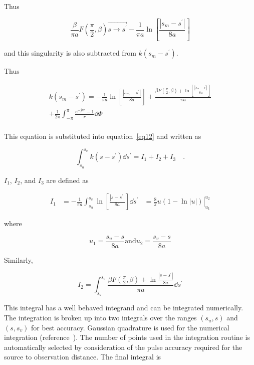 \documentclass[12pt]{article}
\begin{document}
Thus

\begin{equation}
\frac{\beta}{\pi a}F\left(\frac{\pi}{2},\beta\right)
\overrightarrow{s\rightarrow s^\prime}
-\frac{1}{\pi a}\ln\left[\frac{|s_m - s^\prime|}{8a}\right]
\label{eq18}
\end{equation}

and this singularity is also subtracted from $k(s_m-s^\prime)$.

Thus

\begin{equation}
\begin{gathered}
k(s_m - s^\prime) = -\frac{1}{\pi a}\ln \left[\frac{|s_m - s^\prime|}{8a}\right]
+\frac{\beta F(\frac{\pi}{2}, \beta)
      + \ln\left[\frac{|s_m - s^\prime|}{8a}\right]}{\pi a}  \\
+ \frac{1}{2\pi}\int_{-\pi}^\pi\frac{e^{-jkr}-1}{r}\dd{\Phi} \\
\end{gathered}
\label{eq19}
\end{equation}

This equation is substituted into equation~\eqref{eq12} and written as

\begin{equation}
\int_{s_u}^{s_v} k(s-s^\prime)\dd{s^\prime} = I_1 + I_2 + I_3
\quad.
\label{eq20}
\end{equation}

$I_1$, $I_2$, and $I_3$ are defined as

\begin{equation}
\begin{aligned}
I_1 & = -\frac{1}{\pi a}\int_{s_u}^{s_v}
        \ln\left[\frac{|s-s^\prime|}{8a}\right] \dd{s^\prime}
    & = \left.\frac{8}{\pi} u(1-\ln|u|)\right|_{u_1}^{u_2}
\end{aligned}
\label{eq21}
\end{equation}

where

\[ u_1 = \frac{s_u - s}{8a} \mbox{and} u_2 = \frac{s_v - s}{8a}
\]

Similarly,

\begin{equation}
I_2 = \int_{s_u}^{s_v}
\frac{\beta F\left(\frac{\pi}{2}, \beta\right)
+ \ln\frac{|s-s^\prime|}{8a}}{\pi a}\dd{s^\prime}
\label{eq22}
\end{equation}

This integral has a well behaved integrand and can be integrated
numerically. The integration is broken up into two integrals over the
ranges $(s_u, s)$ and $(s, s_v)$ for best accuracy. Gaussian quadrature
is used for the numerical integration (reference~\cite{r7}). The number
of points used in the integration routine is automatically selected by
consideration of the pulse accuracy required for the source to
observation distance. The final integral is
\end{document}
